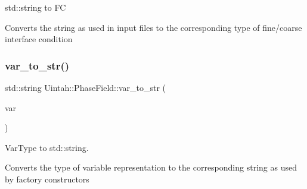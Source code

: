 std\+::string to FC 

Converts the string as used in input files to the corresponding type of fine/coarse interface condition \mbox{\label{namespaceUintah_1_1PhaseField_a85973f31ba84b1b5e1b9efa32baef615}} 
\subsubsection{\texorpdfstring{var\+\_\+to\+\_\+str()}{var\_to\_str()}}
{\footnotesize\ttfamily std\+::string Uintah\+::\+Phase\+Field\+::var\+\_\+to\+\_\+str (\begin{DoxyParamCaption}\item[{\hyperlink{namespaceUintah_1_1PhaseField_a33d355affda78a83f45755ba8388cedd}{Var\+Type}}]{var }\end{DoxyParamCaption})\hspace{0.3cm}{\ttfamily [inline]}}



Var\+Type to std\+::string. 

Converts the type of variable representation to the corresponding string as used by factory constructors 